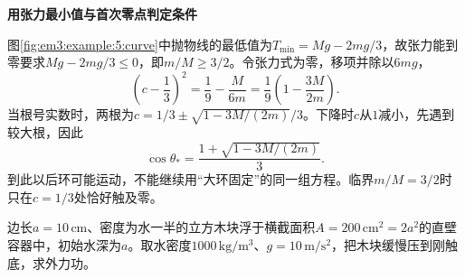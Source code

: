 \begin{solution}
\par\medskip{}\noindent\textbf{用张力最小值与首次零点判定条件}\par\nobreak
图\ref{fig:em3:example:5:curve}中抛物线的最低值为$T_{\min}=Mg-2mg/3$，故张力能到零要求$Mg-2mg/3\le0$，即$\boxed{m/M\ge3/2}$。令张力式为零，移项并除以$6mg$，
\[
\left(c-\frac13\right)^2=\frac19-\frac{M}{6m}
=\frac19\left(1-\frac{3M}{2m}\right).
\]
当根号实数时，两根为$c=1/3\pm\sqrt{1-3M/(2m)}/3$。下降时$c$从$1$减小，先遇到较大根，因此
\[\boxed{\cos\theta_* =\frac{1+\sqrt{1-3M/(2m)}}3}.\]
到此以后环可能运动，不能继续用“大环固定”的同一组方程。临界$m/M=3/2$时只在$c=1/3$处恰好触及零。\end{solution}
\begin{question}\begin{example}[有限容器中压沉浮木]\label{em3:example:6}
边长$a=10\,\mathrm{cm}$、密度为水一半的立方木块浮于横截面积$A=200\,\mathrm{cm^2}=2a^2$的直壁容器中，初始水深为$a$。取水密度$1000\,\mathrm{kg/m^3}$、$g=10\,\mathrm{m/s^2}$，把木块缓慢压到刚触底，求外力功。
\end{example}
\end{question}
